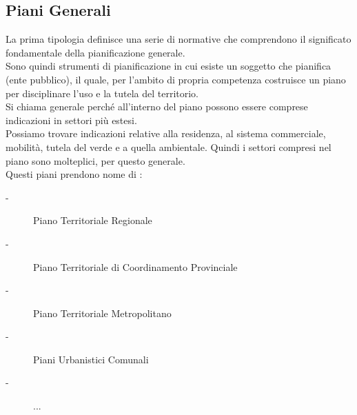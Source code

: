 \documentclass[a4paper,12pt, oneside]{book}
\begin{document}
\subsection{Piani Generali}
La prima tipologia definisce una serie di normative che comprendono il significato fondamentale della pianificazione generale.\\
Sono quindi strumenti di pianificazione in cui esiste un soggetto che pianifica (ente pubblico), il quale, per l'ambito di propria competenza costruisce un piano per disciplinare l'uso e la tutela del territorio.\\
Si chiama generale perché all'interno del piano possono essere comprese indicazioni in settori più estesi.\\
Possiamo trovare indicazioni relative alla residenza, al sistema commerciale, mobilità, tutela del verde e a quella ambientale. Quindi i settori compresi nel piano sono molteplici, per questo generale.\\
Questi piani prendono nome di :
 \begin{description}
   \item [-] Piano Territoriale Regionale
   \item [-] Piano Territoriale di Coordinamento Provinciale
   \item [-] Piano Territoriale Metropolitano
   \item [-] Piani Urbanistici Comunali
   \item [-] ...
 \end{description}
\leavevmode\\ 
\end{document}
